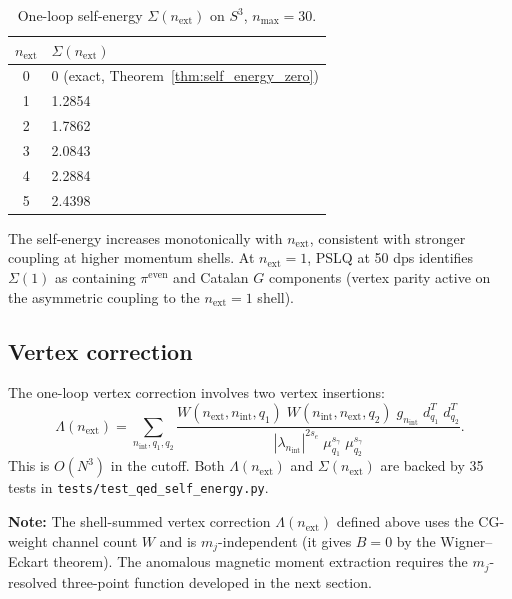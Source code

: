 \documentclass[11pt]{article}
\begin{document}
\begin{table}[h]
\centering
\caption{One-loop self-energy $\Sigma(n_{\mathrm{ext}})$ on $S^3$,
$n_{\max} = 30$.}
\label{tab:self_energy}
\begin{tabular}{@{}cl@{}}
\toprule
$n_{\mathrm{ext}}$ & $\Sigma(n_{\mathrm{ext}})$ \\
\midrule
0 & $0$ (exact, Theorem~\ref{thm:self_energy_zero}) \\
1 & 1.2854 \\
2 & 1.7862 \\
3 & 2.0843 \\
4 & 2.2884 \\
5 & 2.4398 \\
\bottomrule
\end{tabular}
\end{table}

\noindent The self-energy increases monotonically with
$n_{\mathrm{ext}}$, consistent with stronger coupling at higher
momentum shells.  At $n_{\mathrm{ext}} = 1$, PSLQ at 50 dps
identifies $\Sigma(1)$ as containing $\pi^{\mathrm{even}}$ and
Catalan $G$ components (vertex parity active on the asymmetric
coupling to the $n_{\mathrm{ext}} = 1$ shell).

\subsection{Vertex correction}

The one-loop vertex correction involves two vertex insertions:
\begin{equation}
  \Lambda(n_{\mathrm{ext}}) = \sum_{n_{\mathrm{int}}, q_1, q_2}
    \frac{W(n_{\mathrm{ext}}, n_{\mathrm{int}}, q_1) \;
          W(n_{\mathrm{int}}, n_{\mathrm{ext}}, q_2) \;
          g_{n_{\mathrm{int}}} \; d_{q_1}^T \; d_{q_2}^T}
         {|\lambda_{n_{\mathrm{int}}}|^{2s_e} \;
          \mu_{q_1}^{s_\gamma} \; \mu_{q_2}^{s_\gamma}}.
  \label{eq:vertex_correction}
\end{equation}
This is $O(N^3)$ in the cutoff.  Both $\Lambda(n_{\mathrm{ext}})$ and
$\Sigma(n_{\mathrm{ext}})$ are backed by 35 tests in
\texttt{tests/test\_qed\_self\_energy.py}.

\noindent\textbf{Note:} The shell-summed vertex correction
$\Lambda(n_{\mathrm{ext}})$ defined above uses the CG-weight channel
count $W$ and is $m_j$-independent (it gives $B = 0$ by the
Wigner--Eckart theorem).  The anomalous magnetic moment extraction
requires the $m_j$-resolved three-point function developed in the
next section.
\end{document}
